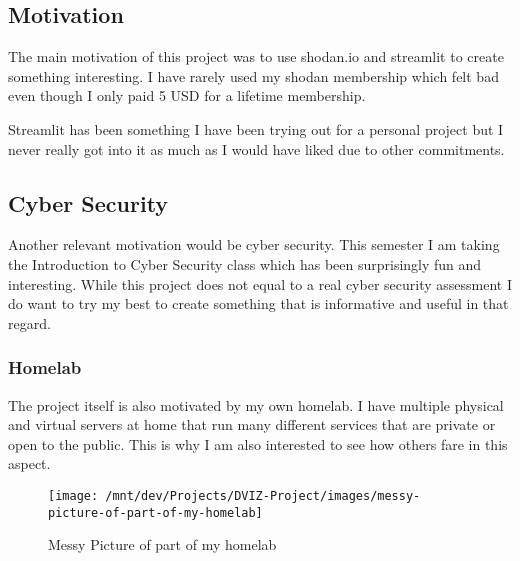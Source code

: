 \documentclass[11pt,a4paper]{article}
\begin{document}
\begin{motivation}
\section{Motivation}
The main motivation of this project was to use shodan.io and streamlit to create something interesting. I have rarely used
my shodan membership which felt bad even though I only paid 5 USD for a lifetime membership.

Streamlit has been something I have been trying out for a personal project but I never really got into it as much as I
would have liked due to other commitments.

\subsection{Cyber Security}
Another relevant motivation would be cyber security. This semester I am taking the Introduction to Cyber Security class
which has been surprisingly fun and interesting. While this project does not equal to a real cyber security assessment I
do want to try my best to create something that is informative and useful in that regard.

\subsubsection{Homelab}
The project itself is also motivated by my own homelab. I have multiple physical and virtual servers at home that run many
different services that are private or open to the public. This is why I am also interested to see how others fare in this aspect.

\begin{figure}[!h]
    \centering
    \texttt{[image: /mnt/dev/Projects/DVIZ-Project/images/messy-picture-of-part-of-my-homelab]}
    \caption{Messy Picture of part of my homelab}
    \label{fig:messy-picture-of-part-of-my-homelab}
\end{figure}

\end{motivation}
\newpage
\end{document}

